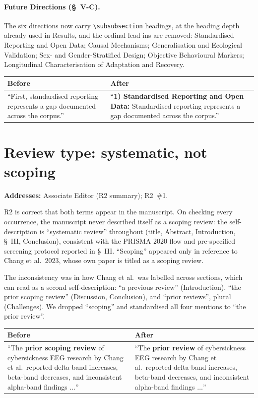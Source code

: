 \documentclass[11pt,a4paper]{article}
\makeatletter
\newcommand{\diffbox}[2]{%
  \begin{center}
  \small
  \begin{tabular}{@{}p{0.46\textwidth}@{\hspace{2em}}p{0.46\textwidth}@{}}
  \toprule
  \textbf{Before} & \textbf{After} \\
  \midrule
  #1 & #2 \\
  \bottomrule
  \end{tabular}
  \end{center}}
\newcommand{\addresses}[1]{\par\noindent\textbf{\small Addresses:} {\small #1}\par\smallskip}
\makeatother
\begin{document}
\paragraph{Future Directions (\S~V-C).} The six directions now carry \verb|\subsubsection| headings, at the heading depth already used in Results, and the ordinal lead-ins are removed: Standardised Reporting and Open Data; Causal Mechanisms; Generalisation and Ecological Validation; Sex- and Gender-Stratified Design; Objective Behavioural Markers; Longitudinal Characterisation of Adaptation and Recovery.

\diffbox{``First, standardised reporting represents a gap documented across the corpus.''}{``\textbf{1) Standardised Reporting and Open Data:} Standardised reporting represents a gap documented across the corpus.''}

\section{Review type: systematic, not scoping}\label{sec:systematic}
\addresses{Associate Editor (R2 summary); R2~\#1.}

R2 is correct that both terms appear in the manuscript. On checking every occurrence, the manuscript never described itself as a scoping review: the self-description is ``systematic review'' throughout (title, Abstract, Introduction, \S~III, Conclusion), consistent with the PRISMA 2020 flow and pre-specified screening protocol reported in \S~III. ``Scoping'' appeared only in reference to Chang et al.\ 2023, whose own paper is titled as a scoping review.

The inconsistency was in how Chang et al.\ was labelled across sections, which can read as a second self-description: ``a previous review'' (Introduction), ``the prior scoping review'' (Discussion, Conclusion), and ``prior reviews'', plural (Challenges). We dropped ``scoping'' and standardised all four mentions to ``the prior review''.

\diffbox{``The \textbf{prior scoping review} of cybersickness EEG research by Chang et al.\ reported delta-band increases, beta-band decreases, and inconsistent alpha-band findings $\ldots$''}{``The \textbf{prior review} of cybersickness EEG research by Chang et al.\ reported delta-band increases, beta-band decreases, and inconsistent alpha-band findings $\ldots$''}
\end{document}
